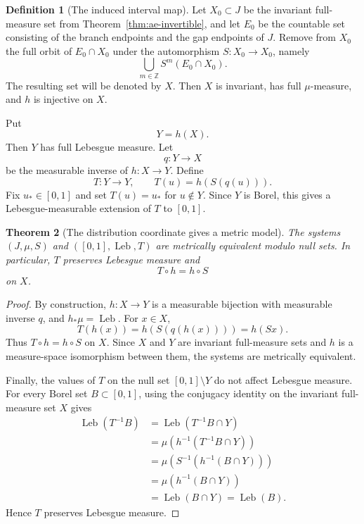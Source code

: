 \documentclass[11pt]{amsart}
\theoremstyle{plain}
\newtheorem{theorem}{Theorem}[section]
\theoremstyle{definition}
\newtheorem{definition}[theorem]{Definition}
\theoremstyle{remark}
\DeclareMathOperator{\Leb}{Leb}
\begin{document}
\begin{definition}[The induced interval map]\label{def:induced-T}
Let $X_0\subset J$ be the invariant full-measure set from Theorem~\ref{thm:ae-invertible}, and let $E_0$ be the countable set consisting of the branch endpoints and the gap endpoints of $J$. Remove from $X_0$ the full orbit of $E_0\cap X_0$ under the automorphism $S:X_0\to X_0$, namely
\[
        \bigcup_{m\in\mathbb Z}S^m(E_0\cap X_0).
\]
The resulting set will be denoted by $X$. Then $X$ is invariant, has full $\mu$-measure, and $h$ is injective on $X$.

Put
\[
        Y=h(X).
\]
Then $Y$ has full Lebesgue measure. Let
\[
        q:Y\to X
\]
be the measurable inverse of $h:X\to Y$. Define
\[
        T:Y\to Y,
        \qquad
        T(u)=h(S(q(u))).
\]
Fix \(u_*\in[0,1]\) and set \(T(u)=u_*\) for \(u\notin Y\). Since \(Y\) is Borel,
this gives a Lebesgue-measurable extension of \(T\) to \([0,1]\).
\end{definition}

\begin{theorem}[The distribution coordinate gives a metric model]\label{thm:metric-model}
The systems $(J,\mu,S)$ and $([0,1],\Leb,T)$ are metrically equivalent modulo null sets. In particular, $T$ preserves Lebesgue measure and
\[
        T\circ h=h\circ S
\]
on $X$.
\end{theorem}

\begin{proof}
By construction, $h:X\to Y$ is a measurable bijection with measurable inverse $q$, and $h_*\mu=\Leb$. For $x\in X$,
\[
        T(h(x))=h(S(q(h(x))))=h(Sx).
\]
Thus $T\circ h=h\circ S$ on $X$. Since $X$ and $Y$ are invariant full-measure sets and $h$ is a measure-space isomorphism between them, the systems are metrically equivalent.

Finally, the values of $T$ on the null set $[0,1]\setminus Y$ do not affect Lebesgue measure. For every Borel set $B\subset[0,1]$, using the conjugacy identity on the invariant full-measure set $X$ gives
\[
\begin{aligned}
\Leb(T^{-1}B)
&=\Leb(T^{-1}B\cap Y) \\
&=\mu(h^{-1}(T^{-1}B\cap Y)) \\
&=\mu(S^{-1}(h^{-1}(B\cap Y))) \\
&=\mu(h^{-1}(B\cap Y)) \\
&=\Leb(B\cap Y)=\Leb(B).
\end{aligned}
\]
Hence $T$ preserves Lebesgue measure.
\end{proof}
\end{document}
